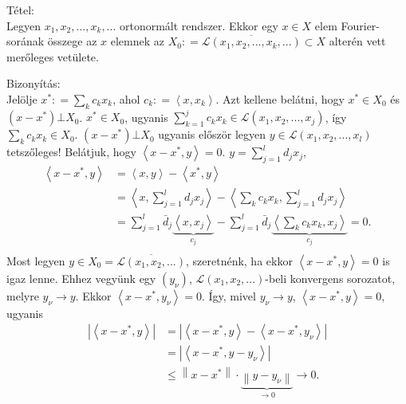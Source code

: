 \documentclass[12pt,a4paper]{scrartcl}
\newenvironment{tetel}{}{}
\newenvironment{bizonyitas}{}{}
\begin{document}
\begin{tetel}

Tétel:\\
Legyen \(x_{1},x_{2},...,x_{k},...\) ortonormált rendszer. Ekkor egy
\(x \in X\) elem Fourier-sorának összege az \(x\) elemnek az
\(X_{0}: = \overline{\mathcal{L}\left( {x_{1},x_{2},...,x_{k},...} \right)} \subset X\)
alterén vett merőleges vetülete.

\end{tetel}

\begin{bizonyitas}

Bizonyítás:\\
Jelölje \(x^{*}: = {\sum\limits_{k}{c_{k}x_{k}}}\), ahol
\(c_{k}: = \left\langle {x,x_{k}} \right\rangle\). Azt kellene belátni,
hogy \(x^{*} \in X_{0}\) és \(\left( {x - x^{*}} \right)\bot X_{0}\).
\(x^{*} \in X_{0}\), ugyanis
\({\sum\limits_{k = 1}^{j}{c_{k}x_{k}}} \in \mathcal{L}\left( {x_{1},x_{2},...,x_{j}} \right)\),
így \({\sum\limits_{k}{c_{k}x_{k}}} \in X_{0}\).
\(\left( {x - x^{*}} \right)\bot X_{0}\) ugyanis először legyen
\(y \in \mathcal{L}\left( {x_{1},x_{2},...,x_{l}} \right)\) tetszőleges!
Belátjuk, hogy \(\left\langle {x - x^{*},y} \right\rangle = 0\).
\(y = {\sum\limits_{j = 1}^{l}{d_{j}x_{j}}}\), \[\begin{aligned}
  \left\langle {x - {x^*},y} \right\rangle  &  = \left\langle {x,y} \right\rangle  - \left\langle {{x^ * },y} \right\rangle  \\ 
   &  = \left\langle {x,\mathop \sum \limits_{j = 1}^l {d_j}{x_j}} \right\rangle  - \left\langle {\mathop \sum \limits_k {c_k}{x_k},\mathop \sum \limits_{j = 1}^l {d_j}{x_j}} \right\rangle  \\ 
   &  = \mathop \sum \limits_{j = 1}^l {{\bar d}_j}\underbrace {\left\langle {x,{x_j}} \right\rangle }_{{c_j}} - \mathop \sum \limits_{j = 1}^l {{\bar d}_j}\underbrace {\left\langle {\mathop \sum \limits_k {c_k}{x_k},{x_j}} \right\rangle }_{{c_j}} = 0 .\\ 
\end{aligned} \] Most legyen
\(y \in X_{0} = \overline{\mathcal{L}\left( {x_{1},x_{2},...} \right)}\),
szeretnénk, ha ekkor \(\left\langle {x - x^{*},y} \right\rangle = 0\) is
igaz lenne. Ehhez vegyünk egy \(\left( y_{\nu} \right)\),
\(\mathcal{L}\left( {x_{1},x_{2},...} \right)\)-beli konvergens
sorozatot, melyre \(\left. y_{\nu}\rightarrow y \right.\). Ekkor
\(\left\langle {x - x^{*},y_{\nu}} \right\rangle = 0\). Így, mivel
\(\left. y_{\nu}\rightarrow y \right.\),
\(\left\langle {x - x^{*},y} \right\rangle = 0\), ugyanis
\[\begin{aligned}
  \left| {\left\langle {x - {x^ * },y} \right\rangle } \right| &  = \left| {\left\langle {x - {x^ * },y} \right\rangle  - \left\langle {x - {x^ * },{y_\nu }} \right\rangle } \right| \\ 
   &  = \left| {\left\langle {x - {x^ * },y - {y_\nu }} \right\rangle } \right| \\ 
   &  \leqslant \left\| {x - {x^ * }} \right\| \cdot \underbrace {\left\| {y - {y_\nu }} \right\|}_{ \to 0} \to 0. \\ 
\end{aligned} \]

\end{bizonyitas}
\end{document}
